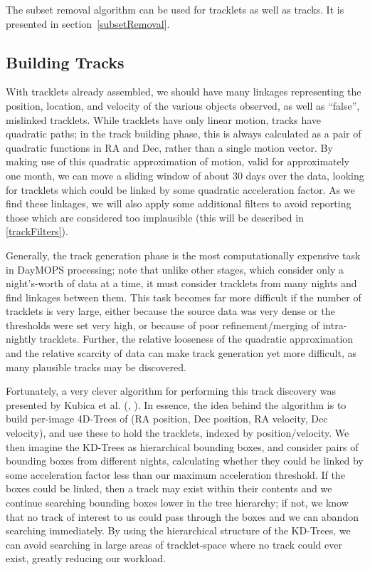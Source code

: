 The subset removal algorithm can be used for tracklets as well as
tracks.  It is presented in section~\ref{subsetRemoval}.










\subsection{Building Tracks}

With tracklets already assembled, we should have many linkages
representing the position, location, and velocity of the various
objects observed, as well as ``false'', mislinked tracklets.  While
tracklets have only linear motion, tracks have quadratic paths; in the
track building phase, this is always calculated as a pair of quadratic
functions in RA and Dec, rather than a single motion vector.  By
making use of this quadratic approximation of motion, valid for
approximately one month, we can move a sliding window of about 30 days
over the data, looking for tracklets which could be linked by some
quadratic acceleration factor.  As we find these linkages, we will
also apply some additional filters to avoid reporting those which are
considered too implausible (this will be described in
\ref{trackFilters}).

Generally, the track generation phase is the most computationally
expensive task in DayMOPS processing; note that unlike other stages,
which consider only a night's-worth of data at a time, it must
consider tracklets from many nights and find linkages between them.
This task becomes far more difficult if the number of tracklets is
very large, either because the source data was very dense or the
thresholds were set very high, or because of poor refinement/merging
of intra-nightly tracklets.  Further, the relative looseness of the
quadratic approximation and the relative scarcity of data can make
track generation yet more difficult, as many plausible tracks may be
discovered.

Fortunately, a very clever algorithm for performing this track
discovery was presented by Kubica et al. (\citet{kubica_thesis},
\citet{Kubica:2005:MTA:1081870.1081889}).  In essence, the idea behind
the algorithm is to build per-image 4D-Trees of (RA position, Dec
position, RA velocity, Dec velocity), and use these to hold the
tracklets, indexed by position/velocity.  We then imagine the KD-Trees
as hierarchical bounding boxes, and consider pairs of bounding boxes
from different nights, calculating whether they could be linked by
some acceleration factor less than our maximum acceleration threshold.
If the boxes could be linked, then a track may exist within their
contents and we continue searching bounding boxes lower in the tree
hierarchy; if not, we know that no track of interest to us could pass
through the boxes and we can abandon searching immediately.  By using
the hierarchical structure of the KD-Trees, we can avoid searching in
large areas of tracklet-space where no track could ever exist, greatly
reducing our workload.


